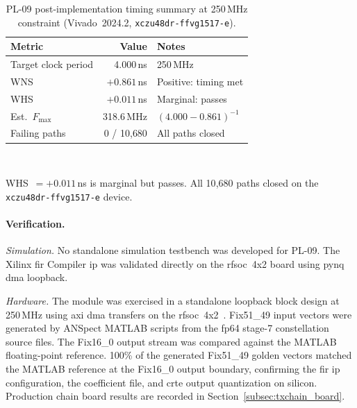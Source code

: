 \vspace{-30pt}\leavevmode\par
\begin{table}[!h]
  \caption{PL-09 post-implementation timing summary at 250\,MHz constraint
           (Vivado~2024.2, \texttt{xczu48dr\allowbreak-ffvg1517\allowbreak-e}).}
  \label{tab:pl09_timing}
  \centering
  \begin{tabular}{lrl}
    \hline
    Metric & Value & Notes \\
    \hline
    Target clock period & 4.000\,ns    & 250\,MHz \\[2pt]
    WNS                 & $+0.861$\,ns & Positive: timing met \\[2pt]
    WHS                 & $+0.011$\,ns & Marginal: passes \\[2pt]
    Est.\ $F_{\max}$    & 318.6\,MHz   & $(4.000 - 0.861)^{-1}$ \\[2pt]
    Failing paths       & 0 / 10{,}680 & All paths closed \\
    \hline
  \end{tabular}\\[4pt]
  \begin{minipage}{\linewidth}
    \small
    WHS~$= +0.011$\,ns is marginal but passes.
    All 10{,}680 paths closed on the \texttt{xczu48dr\allowbreak-ffvg1517\allowbreak-e} device.
  \end{minipage}
\end{table}

\FloatBarrier


\paragraph{Verification.}

\textit{Simulation.}
No standalone simulation testbench was developed for PL-09.
The Xilinx \ac{fir} Compiler \ac{ip} was validated directly on the
\ac{rfsoc}~4x2 board using \ac{pynq} \ac{dma} loopback.

\textit{Hardware.}
The module was exercised in a standalone loopback block design
at 250\,MHz using \ac{axi} \ac{dma} transfers
on the \ac{rfsoc}~4x2~\cite{PYNQ_DOC}.
Fix51\_49 input vectors were generated by ANSpect MATLAB scripts
from the fp64 stage-7 constellation source files.
The Fix16\_0 output stream was compared against the MATLAB
floating-point reference.
100\% of the generated Fix51\_49 golden vectors matched the MATLAB
reference at the Fix16\_0 output boundary, confirming the \ac{fir}
\ac{ip} configuration, the coefficient file, and \ac{crte} output
quantization on silicon.
Production chain board results are recorded in
Section~\ref{subsec:txchain_board}.

